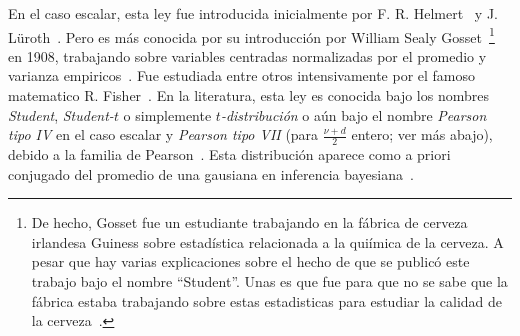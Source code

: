 \label{Sssec:MP:StudentT}

En   el  caso   escalar,  esta   ley   fue  introducida   inicialmente  por   F.
R. Helmert~\cite{Hel75, Hel76, She95}  y J.  L\"uroth~\cite{Lur76, Pfa96}.  Pero
es m\'as  conocida por su  introducci\'on por William  Sealy Gosset~\footnote{De
  hecho,  Gosset  fue  un  estudiante  trabajando en  la  f\'abrica  de  cerveza
  irlandesa  Guiness  sobre estad\'istica  relacionada  a  la  qui\'imica de  la
  cerveza.   A pesar  que hay  varias  explicaciones sobre  el hecho  de que  se
  public\'o este trabajo bajo el nombre ``Student''. Unas es que fue para que no
  se  sabe que  la f\'abrica  estaba  trabajando sobre  estas estadisticas  para
  estudiar  la calidad  de  la cerveza~\cite{Wen16}.\label{Foot:MP:Student}}  en
1908,  trabajando  sobre variables  centradas  normalizadas  por  el promedio  y
varianza empiricos~\cite{Stu08}.   Fue estudiada entre  otros intensivamente por
el  famoso matematico  R. Fisher~\cite{Fis25}.   En la  literatura, esta  ley es
conocida bajo  los nombres {\em  Student}, {\em Student-$t$} o  simplemente {\em
  $t$-distribuci\'on} o  a\'un bajo el nombre  {\em Pearson tipo IV}  en el caso
escalar  y {\em  Pearson tipo  VII}  (para $\frac{\nu+d}{2}$  entero; ver  m\'as
abajo), debido  a la  familia de Pearson~\cite{Pea95,  JohKot95:v1, JohKot95:v1,
  KotBal00, FanKot90}.  Esta distribuci\'on aparece como a  priori conjugado del
promedio de una gausiana en inferencia bayesiana~\cite{Rob07, KotNad04}.

